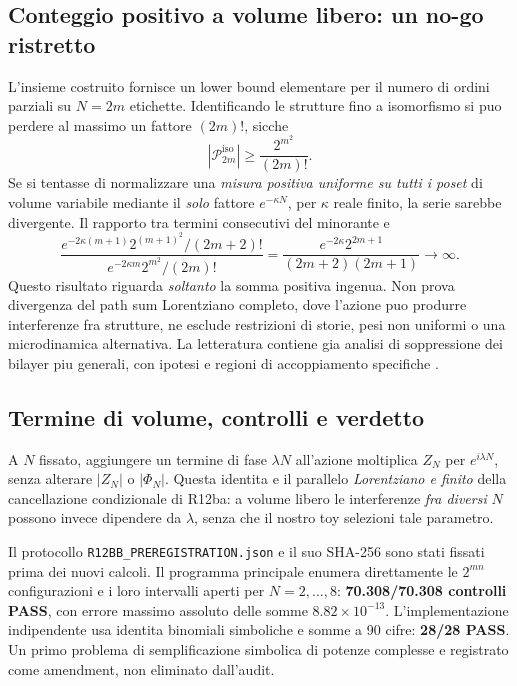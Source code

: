 \documentclass[11pt,a4paper]{article}
\begin{document}
\subsection{Conteggio positivo a volume libero: un no-go ristretto}
L'insieme costruito fornisce un lower bound elementare per il numero di ordini parziali su $N=2m$ etichette. Identificando le strutture fino a isomorfismo si puo perdere al massimo un fattore $(2m)!$, sicche
\begin{equation}\label{eq:r12bb_entropy}
 |\mathcal P_{2m}^{\mathrm{iso}}|\ge\frac{2^{m^2}}{(2m)!}.
\end{equation}
Se si tentasse di normalizzare una \emph{misura positiva uniforme su tutti i poset} di volume variabile mediante il \emph{solo} fattore $e^{-\kappa N}$, per $\kappa$ reale finito, la serie sarebbe divergente. Il rapporto tra termini consecutivi del minorante e
\begin{equation}\label{eq:r12bb_ratio}
\frac{e^{-2\kappa(m+1)}2^{(m+1)^2}/(2m+2)!}
     {e^{-2\kappa m}2^{m^2}/(2m)!}
=\frac{e^{-2\kappa}2^{2m+1}}{(2m+2)(2m+1)}\longrightarrow\infty.
\end{equation}
Questo risultato riguarda \emph{soltanto} la somma positiva ingenua. Non prova divergenza del path sum Lorentziano completo, dove l'azione puo produrre interferenze fra strutture, ne esclude restrizioni di storie, pesi non uniformi o una microdinamica alternativa. La letteratura contiene gia analisi di soppressione dei bilayer piu generali, con ipotesi e regioni di accoppiamento specifiche \cite{LoomisCarlip2018,Carlip2024}.

\subsection{Termine di volume, controlli e verdetto}
A $N$ fissato, aggiungere un termine di fase $\lambda N$ all'azione moltiplica $Z_N$ per $e^{i\lambda N}$, senza alterare $|Z_N|$ o $|\Phi_N|$. Questa identita e il parallelo \emph{Lorentziano e finito} della cancellazione condizionale di R12ba: a volume libero le interferenze \emph{fra diversi} $N$ possono invece dipendere da $\lambda$, senza che il nostro toy selezioni tale parametro.

Il protocollo \texttt{R12BB\_PREREGISTRATION.json} e il suo SHA-256 sono stati fissati prima dei nuovi calcoli. Il programma principale enumera direttamente le $2^{mn}$ configurazioni e i loro intervalli aperti per $N=2,\ldots,8$: \textbf{70.308/70.308 controlli PASS}, con errore massimo assoluto delle somme $8.82\times10^{-13}$. L'implementazione indipendente usa identita binomiali simboliche e somme a 90 cifre: \textbf{28/28 PASS}. Un primo problema di semplificazione simbolica di potenze complesse e registrato come amendment, non eliminato dall'audit.
\end{document}
